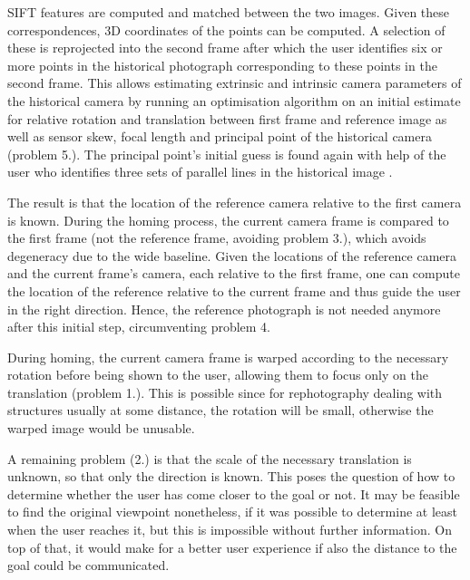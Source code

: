 SIFT features \citep{lowe1999} are computed and matched between the two images.
Given these correspondences, 3D coordinates of the points can be computed. A
selection of these is reprojected into the second frame after which the user
identifies six or more points in the historical photograph corresponding to
these points in the second frame. This allows estimating extrinsic and
intrinsic camera parameters of the historical camera by running an optimisation
algorithm on an initial estimate for relative rotation and translation between
first frame and reference image as well as sensor skew, focal length and
principal point of the historical camera (problem 5.).  The principal point's initial guess
is found again with help of the user who identifies three sets of parallel lines
in the historical image \citep[see][chapter 8.8]{h&z2004}.

The result is that the location of the reference camera relative to the first
camera is known. During the homing process, the current camera frame is compared
to the first frame (not the reference frame, avoiding problem 3.), which avoids
degeneracy due to the wide baseline. Given the locations of the reference camera
and the current frame's camera, each relative to the first frame, one can
compute the location of the reference relative to the current frame and thus
guide the user in the right direction. Hence, the reference photograph is not
needed anymore after this initial step, circumventing problem 4.

During homing, the current camera frame is warped according to the necessary
rotation before being shown to the user, allowing them to focus only on the
translation (problem 1.). This is possible since for rephotography
dealing with structures usually at some distance, the rotation will be small,
otherwise the warped image would be unusable.

A remaining problem (2.) is that the scale of the necessary translation is unknown,
so that only the direction is known. This poses the question of how to determine
whether the user has come closer to the goal or not. It may be feasible to find
the original viewpoint nonetheless, if it was possible to determine at least
when the user reaches it, but this is impossible without further information. On
top of that, it would make for a better user experience if also the distance to
the goal could be communicated.

